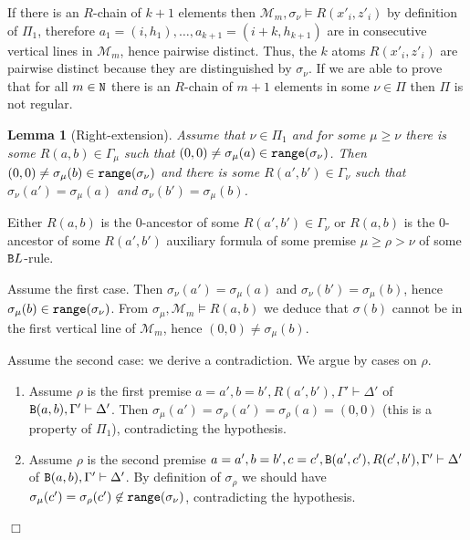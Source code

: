 \documentclass[a4paper,12pt]{article}
\newtheorem{lemma}[theorem]{Lemma}
\newenvironment{proof}[1][Proof]{\begin{trivlist}
\item[\hskip \labelsep {\bfseries #1}]}{\end{trivlist}}
\newcommand{\setM}              { {\mathcal M} }
\newcommand{\Nat}               { {\tt N}  }
\newcommand{\Backward}         { {\tt B} }
\newcommand{\range}           { {\tt range} }
\begin{document}
If there is an $R$-chain of $k+1$ elements then $\setM_m, \sigma_\nu \models R(x'_i,z'_i)$ by definition of $\Pi_1$, therefore $a_1=(i,h_1), \ldots, a_{k+1}=(i+k,h_{k+1})$ are in consecutive vertical lines in $\setM_m$, hence pairwise distinct. Thus, the $k$ atoms $R(x'_i,z'_i)$ are pairwise distinct because they are distinguished by $\sigma_\nu$. If we are able to prove that for all $m \in \Nat$ there is an $R$-chain of $m+1$ elements in some $\nu \in \Pi$ then $\Pi$ is not regular.


\begin{lemma}[Right-extension]
\label{lemma-right-extension}
Assume that $\nu \in \Pi_1$ and for some $\mu \ge \nu$ there is some $R(a, b) \in \Gamma_\mu$ such that $(0,0) \not =\sigma_\mu(a) \in \range(\sigma_\nu)$. Then $(0,0) \not = \sigma_\mu(b)\in \range(\sigma_\nu)$ and there is some $R(a',b') \in \Gamma_\nu$ such that $\sigma_\nu(a') = \sigma_\mu(a)$ and $\sigma_\nu(b') = \sigma_\mu(b)$.
\end{lemma} 

\begin{proof}
Either $R(a,b)$ is the $0$-ancestor of some $R(a',b') \in \Gamma_\nu$ or $R(a,b)$ is the $0$-ancestor of some $R(a',b')$ auxiliary formula of some premise $\mu \ge \rho > \nu$ of some $\Backward L$-rule.  

Assume the first case. Then $\sigma_\nu(a') = \sigma_\mu(a)$ and $\sigma_\nu(b') = \sigma_\mu(b)$, hence $\sigma_\mu(b) \in \range(\sigma_\nu)$. From $\sigma_\mu, \setM_m \models R(a,b)$ we deduce that $\sigma(b)$ cannot be in the first vertical line of $\setM_m$, hence $(0,0) \not = \sigma_\mu(b)$. 

Assume the second case: we derive a contradiction. We argue by cases on $\rho$.
\begin{enumerate}
\item
Assume $\rho$ is the first premise $a=a',b=b', R(a',b'), \Gamma' \vdash \Delta'$ of $\Backward(a,b), \Gamma' \vdash \Delta'$. Then $\sigma_\mu(a') = \sigma_\rho(a') = \sigma_\rho(a) = (0,0)$ (this is a property of $\Pi_1$), contradicting the hypothesis.
\item
Assume $\rho$ is the second premise $a=a',b=b', c=c', \Backward(a',c'), R(c',b'), \Gamma' \vdash \Delta'$ of $\Backward(a,b), \Gamma' \vdash \Delta'$. By definition of $\sigma_{\rho}$ we should have $\sigma_\mu(c') = \sigma_\rho(c') \not \in \range(\sigma_\nu)$, contradicting the hypothesis.
\end{enumerate}
$\Box$
\end{proof}
\end{document}

